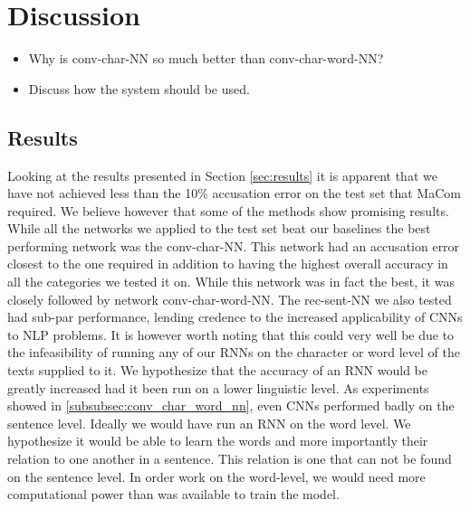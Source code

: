 \section{Discussion} \label{sec:discussion}

\begin{itemize}

    \item

        Why is conv-char-NN so much better than conv-char-word-NN?

    \item

        Discuss how the system should be used.

\end{itemize}


\subsection{Results}

Looking at the results presented in Section \ref{sec:results} it is apparent
that we have not achieved less than the 10\% accusation error on the test
set that MaCom required. We believe however that some of the methods show
promising results. While all the networks we applied to the test set beat
our baselines the best performing network was the \gls{conv-char-NN}. This
network had an accusation error closest to the one required in addition to
having the highest overall accuracy in all the categories we tested it on.
While this network was in fact the best, it was closely followed by network
\gls{conv-char-word-NN}. The \gls{rec-sent-NN} we also tested had sub-par
performance, lending credence to the increased applicability of \glspl{CNN} to
\gls{NLP} problems. It is however worth noting that this could very well be
due to the infeasibility of running any of our \glspl{RNN} on the character or
word level of the texts supplied to it. We hypothesize that the accuracy of an
RNN would be greatly increased had it been run on a lower linguistic level.
As experiments showed in \ref{subsubsec:conv_char_word_nn}, even \gls{CNN}s
performed badly on the sentence level. Ideally we would have run an RNN on the
word level. We hypothesize it would be able to learn the words and more importantly
their relation to one another in a sentence. This relation is one that can not
be found on the sentence level. In order work on the word-level, we would need
more computational power than was available to train the model.

